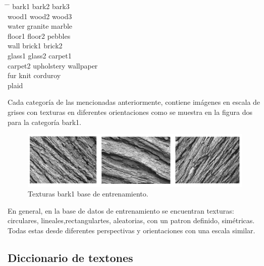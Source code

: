 \documentclass[10pt,twocolumn,letterpaper]{article}
\begin{document}
\begin{tabbing}
\hspace*{3cm} \= \hspace*{3cm} \= \hspace*{3cm} \kill
bark1 \> bark2 \> bark3 \\
wood1 \> wood2 \> wood3 \\
water \> granite \> marble \\
floor1 \> floor2 \> pebbles \\
wall \> brick1 \> brick2 \\
glass1 \> glass2 \> carpet1 \\
carpet2 \> upholstery \> wallpaper \\
fur \> knit \> corduroy \\
plaid \>  \>  \\
\end{tabbing}

Cada categoría de las mencionadas anteriormente, contiene imágenes en escala de grises con texturas en diferentes orientaciones como se muestra en la figura dos para la categoría bark1.

\begin{figure}[t]
\begin{center}
   \includegraphics[width=1\linewidth]{train_tex.png}
\end{center}
   \caption{Texturas bark1 base de entrenamiento.}
\label{fig:seg}
\end{figure}

En general, en la base de datos de entrenamiento se encuentran texturas: circulares, lineales,rectangulartes, aleatorias, con un patron definido, simétricas. Todas estas desde diferentes perspectivas y orientaciones con una escala similar.

\subsection{Diccionario de textones}
\end{document}
